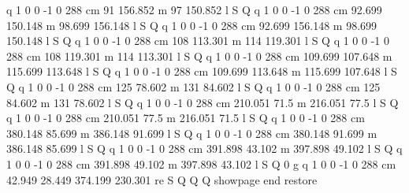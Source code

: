 q 1 0 0 -1 0 288 cm
91 156.852 m 97 150.852 l S Q
q 1 0 0 -1 0 288 cm
92.699 150.148 m 98.699 156.148 l S Q
q 1 0 0 -1 0 288 cm
92.699 156.148 m 98.699 150.148 l S Q
q 1 0 0 -1 0 288 cm
108 113.301 m 114 119.301 l S Q
q 1 0 0 -1 0 288 cm
108 119.301 m 114 113.301 l S Q
q 1 0 0 -1 0 288 cm
109.699 107.648 m 115.699 113.648 l S Q
q 1 0 0 -1 0 288 cm
109.699 113.648 m 115.699 107.648 l S Q
q 1 0 0 -1 0 288 cm
125 78.602 m 131 84.602 l S Q
q 1 0 0 -1 0 288 cm
125 84.602 m 131 78.602 l S Q
q 1 0 0 -1 0 288 cm
210.051 71.5 m 216.051 77.5 l S Q
q 1 0 0 -1 0 288 cm
210.051 77.5 m 216.051 71.5 l S Q
q 1 0 0 -1 0 288 cm
380.148 85.699 m 386.148 91.699 l S Q
q 1 0 0 -1 0 288 cm
380.148 91.699 m 386.148 85.699 l S Q
q 1 0 0 -1 0 288 cm
391.898 43.102 m 397.898 49.102 l S Q
q 1 0 0 -1 0 288 cm
391.898 49.102 m 397.898 43.102 l S Q
0 g
q 1 0 0 -1 0 288 cm
42.949 28.449 374.199 230.301 re S Q
Q Q
showpage
end restore

